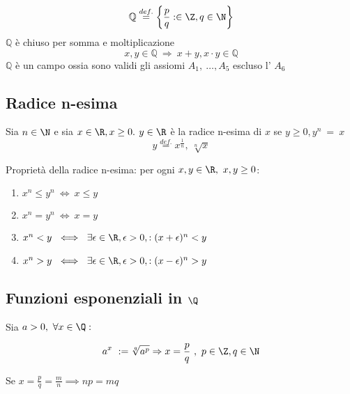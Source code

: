 \documentclass[../appunti.tex]{subfiles}
\begin{document}
\begin{defn}
	\begin{equation}
		\mathbb{Q} \overset{def.}{=} \left\{ \frac{p}{q}: \in \Z,q \in \N \right\}
	\end{equation}
$\mathbb{Q}$ è chiuso per somma e moltiplicazione
\begin{equation} 
	x,y \in \mathbb{Q}\ \Rightarrow\ x+y, x \cdot y \in \mathbb{Q}
\end{equation}
$\mathbb{Q}$ è un campo  ossia sono validi gli assiomi $A_1,\ \dots, A_5$ escluso l' $A_6$
\end{defn}

\subsection{Radice n-esima}
Sia $n\in \N$ e sia $x\in \R, x \geq 0. \newline$
$y \in \R$ è la radice n-esima di $x$ se $ y \geq 0, y^n\ =\ x$
\begin{equation}
y \overset{def.}{=} x^{\frac{1}{n}},\ \sqrt[n]{x}
\end{equation}

\begin{defn}
	Proprietà della radice n-esima: per ogni $x,y \in \R,\ x,y \geq 0$:
	\begin{enumerate}[label = $P_{\arabic*}$]
		\item $x^n \leq y^n\ \iff\ x \leq y$
		\item $x^n = y^n\ \iff\ x=y$
		\item $x^n < y\ \iff\ \exists \epsilon \in \R, \epsilon > 0, : (x+\epsilon)^n <y$
		\item $x^n > y\ \iff\ \exists \epsilon \in \R, \epsilon > 0, : (x-\epsilon)^n>y$
\end{enumerate}
\end{defn}

\subsection{Funzioni esponenziali in $\Q$}

\begin{defn}
	Sia $ a > 0,\ \forall x \in \Q: $

	\begin{equation}
	a^x\ := \sqrt[q]{a^p} \Rightarrow x = \frac{p}{q}\ ,\ p \in \Z, q\in \N
	\end{equation}
\end{defn}
Se $ x = \frac{p}{q} = \frac{m}{n} \implies np = mq$
\end{document}
